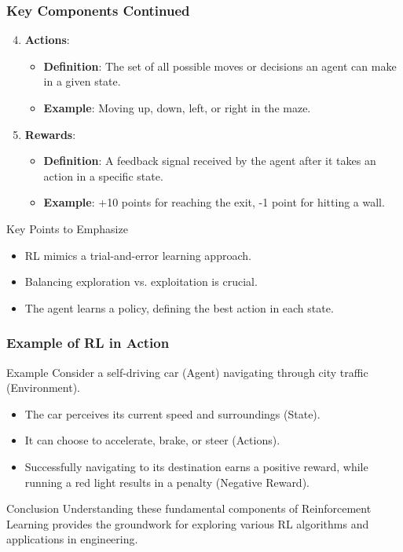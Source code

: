 \documentclass[aspectratio=169]{beamer}
\begin{document}
\begin{frame}[fragile]
  \frametitle{Key Components Continued}
  \begin{enumerate}
    \setcounter{enumi}{3}
    
    \item \textbf{Actions}:
      \begin{itemize}
        \item \textbf{Definition}: The set of all possible moves or decisions an agent can make in a given state.
        \item \textbf{Example}: Moving up, down, left, or right in the maze.
      \end{itemize}

    \item \textbf{Rewards}:
      \begin{itemize}
        \item \textbf{Definition}: A feedback signal received by the agent after it takes an action in a specific state.
        \item \textbf{Example}: +10 points for reaching the exit, -1 point for hitting a wall.
      \end{itemize}
  \end{enumerate}
  
  \begin{block}{Key Points to Emphasize}
    \begin{itemize}
      \item RL mimics a trial-and-error learning approach.
      \item Balancing exploration vs. exploitation is crucial.
      \item The agent learns a policy, defining the best action in each state.
    \end{itemize}
  \end{block}
\end{frame}

\begin{frame}[fragile]
  \frametitle{Example of RL in Action}
  \begin{block}{Example}
    Consider a self-driving car (Agent) navigating through city traffic (Environment). 
    \begin{itemize}
      \item The car perceives its current speed and surroundings (State).
      \item It can choose to accelerate, brake, or steer (Actions).
      \item Successfully navigating to its destination earns a positive reward, while running a red light results in a penalty (Negative Reward).
    \end{itemize}
  \end{block}
  \begin{block}{Conclusion}
    Understanding these fundamental components of Reinforcement Learning provides the groundwork for exploring various RL algorithms and applications in engineering.
  \end{block}
\end{frame}
\end{document}
